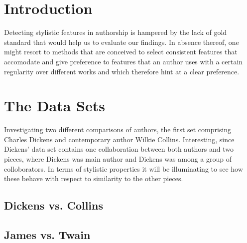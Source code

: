 \documentclass[a4paper,10pt,twoside,fleqn]{article}
\begin{document}
\section{Introduction}

Detecting stylistic features in authorship is hampered by the lack of gold
standard that would help us to evaluate our findings. 
In absence thereof, one might resort to methods that are conceived to select 
consistent features that accomodate and give preference to features that 
an author uses with a certain regularity over different works and which 
therefore hint at a clear preference. 




\section{The Data Sets}

Investigating two different comparisons of authors, the first set comprising Charles Dickens and 
contemporary author Wilkie Collins. 
Interesting, since Dickens' data set contains one collaboration between both authors and 
two pieces, where Dickens was main author and Dickens was among a group of colloborators. 
In terms of stylistic properties it will be illuminating to see how these behave 
with respect to similarity to the other pieces. 

\subsection{Dickens vs. Collins}




\subsection{James vs. Twain}
\end{document}
